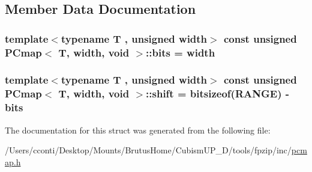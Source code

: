 \subsection{Member Data Documentation}
\hypertarget{struct_p_cmap_3_01_t_00_01width_00_01void_01_4_ac0a988f7b861a5fb9cae1825ed582a14}{}
\subsubsection[{bits}]{\setlength{\rightskip}{0pt plus 5cm}template$<$typename T , unsigned width$>$ const unsigned {\bf P\+Cmap}$<$ T, width, void $>$\+::bits = width\hspace{0.3cm}{\ttfamily [static]}}\label{struct_p_cmap_3_01_t_00_01width_00_01void_01_4_ac0a988f7b861a5fb9cae1825ed582a14}
\hypertarget{struct_p_cmap_3_01_t_00_01width_00_01void_01_4_afbf36f52b1cf07b01bb37244cc7bc7ff}{}
\subsubsection[{shift}]{\setlength{\rightskip}{0pt plus 5cm}template$<$typename T , unsigned width$>$ const unsigned {\bf P\+Cmap}$<$ T, width, void $>$\+::shift = {\bf bitsizeof}({\bf R\+A\+N\+G\+E}) -\/ {\bf bits}\hspace{0.3cm}{\ttfamily [static]}}\label{struct_p_cmap_3_01_t_00_01width_00_01void_01_4_afbf36f52b1cf07b01bb37244cc7bc7ff}


The documentation for this struct was generated from the following file\+:\begin{DoxyCompactItemize}
\item 
/\+Users/cconti/\+Desktop/\+Mounts/\+Brutus\+Home/\+Cubism\+U\+P\+\_\+D/tools/fpzip/inc/\hyperlink{pcmap_8h}{pcmap.\+h}\end{DoxyCompactItemize}
